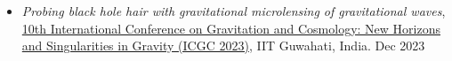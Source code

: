 \begin{itemize}
    \item \textit{Probing black hole hair with gravitational microlensing of gravitational waves}, \href{https://indico.cern.ch/event/1268737/registrations/participants}{10th International Conference on Gravitation and Cosmology: New Horizons and Singularities in Gravity (ICGC 2023)}, IIT Guwahati, India. \hfill{Dec 2023}

\end{itemize}